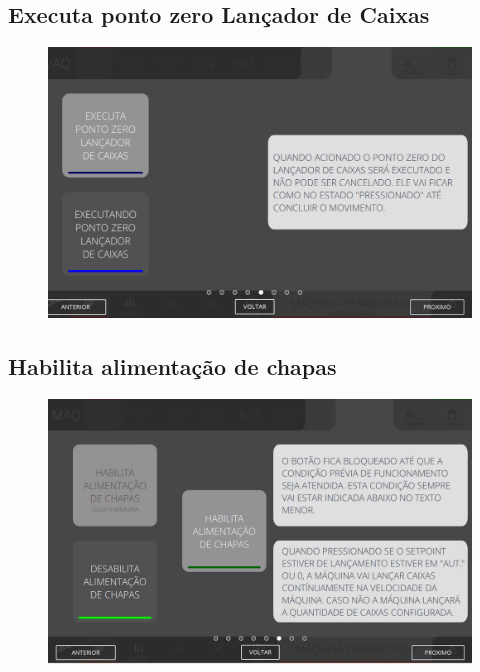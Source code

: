 \subsection{Executa ponto zero Lançador de Caixas}
\begin{figure}
    \centering
    \includegraphics[width=576 px,height=360 px]{src/imagesICV/03-feeder/commands/6.png}
\end{figure}
\newpage
\thispagestyle{fancy}
\vspace{\fill}

\subsection{Habilita alimentação de chapas}
\begin{figure}
    \centering
    \includegraphics[width=576 px,height=360 px]{src/imagesICV/03-feeder/commands/7.png}
\end{figure}
\newpage
\thispagestyle{fancy}
\vspace{\fill}

